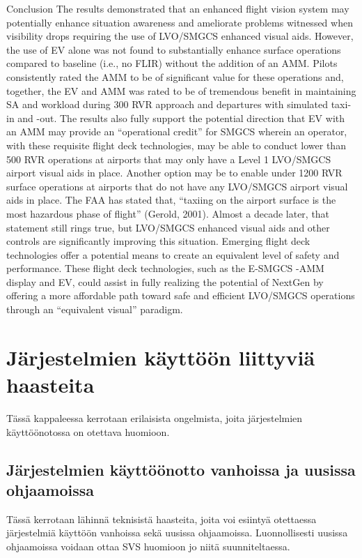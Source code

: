 \documentclass[utf8,bachelor,manualbib]{gradu3}
\begin{document}
Conclusion
The results demonstrated that an enhanced flight vision system may potentially enhance situation awareness and ameliorate problems witnessed when visibility drops requiring the use of LVO/SMGCS enhanced visual aids. However, the use of EV alone was not found to substantially enhance surface operations compared to baseline (i.e., no FLIR) without the addition of an AMM. Pilots consistently rated the AMM to be of significant value for these operations and, together, the EV and AMM was rated to be of tremendous benefit in maintaining SA and workload during 300 RVR approach and departures with simulated taxi-in and -out. The results also fully support the potential direction that EV with an AMM may provide an “operational credit” for SMGCS wherein an operator, with these requisite flight deck technologies, may be able to conduct lower than 500 RVR operations at airports that may only have a Level 1 LVO/SMGCS airport visual aids in place. Another option may be to enable under 1200 RVR surface operations at airports that do not have any LVO/SMGCS airport visual aids in place.
The FAA has stated that, “taxiing on the airport surface is the most hazardous phase of flight” (Gerold, 2001). Almost a decade later, that statement still rings true, but LVO/SMGCS enhanced visual aids and other controls are significantly improving this situation. Emerging flight deck technologies offer a potential means to create an equivalent level of safety and performance. These flight deck technologies, such as the E-SMGCS -AMM display and EV, could assist in fully realizing the potential of NextGen by offering a more affordable path toward safe and efficient LVO/SMGCS operations through an “equivalent visual” paradigm. \citep{prinzel2013}

\chapter{Järjestelmien käyttöön liittyviä haasteita}

Tässä kappaleessa kerrotaan erilaisista ongelmista, joita järjestelmien käyttöönotossa on otettava huomioon.

\section{Järjestelmien käyttöönotto vanhoissa ja uusissa ohjaamoissa}

Tässä kerrotaan lähinnä teknisistä haasteita, joita voi esiintyä otettaessa järjestelmiä käyttöön vanhoissa sekä uusissa ohjaamoissa. Luonnollisesti uusissa ohjaamoissa voidaan ottaa SVS huomioon jo niitä suunniteltaessa.
\end{document}
